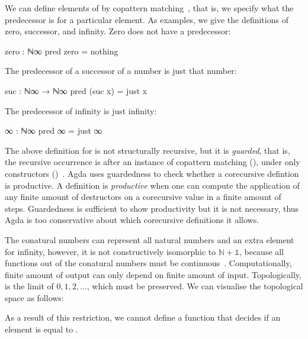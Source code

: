 We can define elements of  by copattern
matching~\cite{abel-copatterns}, that is, we specify what the predecessor is for
a particular element. As examples, we give the definitions of zero, successor,
and infinity. Zero does not have a predecessor:
\begin{code}
zero : ℕ∞
pred zero = nothing
\end{code}
The predecessor of a successor of a number is just that number:
\begin{code}
suc : ℕ∞ → ℕ∞
pred (suc x) = just x
\end{code}
The predecessor of infinity is just infinity:
\begin{code}
∞ : ℕ∞
pred ∞ = just ∞
\end{code}
The above definition for  is not structurally recursive, but it
is \emph{guarded}, that is, the recursive occurrence is after an instance of
copattern matching (), under only constructors
()~\cite{coquand-infinite}. Agda uses guardedness
to check whether a corecursive defintion is productive. A definition is
\emph{productive} when one can compute the application of any finite amount of
destructors on a corecursive value in a finite amount of steps. Guardedness is
sufficient to show productivity but it is not necessary, thus Agda is too
conservative about which corecursive definitions it allows.

The conatural numbers can represent all natural numbers and an extra element for
infinity, however, it is not constructively isomorphic to $\mathbb{N} +
\mathbb{1}$, because all functions out of the conatural numbers must be
continuous~\cite{escardo-infinite}. Computationally, finite amount of output can
only depend on finite amount of input. Topologically,  is the
limit of $0, 1, 2, \dots$, which must be preserved. We can visualise the
topological space as follows:
\begin{center}
\end{center}
As a result of this restriction, we cannot define a function that decides if an
element is equal to .

